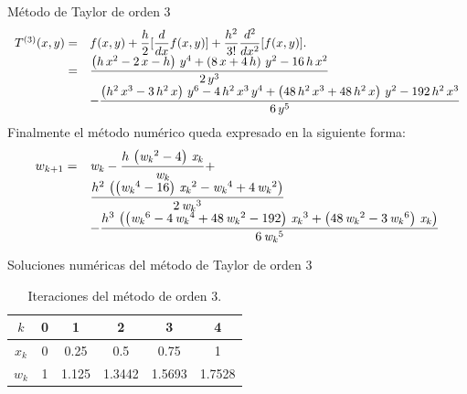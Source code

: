 \begin{frame}{Método de Taylor de orden 3}
\small
\textcolor{cyan}{
\begin{displaymath}
\begin{array}{rl}
T^{(3)}(x,y)=&f(x,y)+\dfrac{h}{2}[\dfrac{d}{dx}f(x,y)]+\dfrac{h^{2}}{3!}\dfrac{d^{2}}{dx^{2}}[f(x,y)].\\
=&\displaystyle {{\left(h\,x^2-2\,x-h\right)\,y^4+\left(8\,x+4\,h\right)\,y^2-16\,h
 \,x^2}\over{2\,y^3}}\\
 &\displaystyle -{{\left(h^2\,x^3-3\,h^2\,x\right)\,y^6-4\,h^2\,x^3\,y^4+\left(48\,
 h^2\,x^3+48\,h^2\,x\right)\,y^2-192\,h^2\,x^3}\over{6\,y^5}}
\end{array}
\end{displaymath}
}
Finalmente el método numérico queda expresado en la siguiente forma:
\textcolor{cyan}{
\begin{displaymath}
\renewcommand{\arraystretch}{1.5}
\begin{array}{rl}
w_{k+1}=&\displaystyle {\it w_k}-{{h\,\left({\it w_k}^2-4\right)\,{\it x_k}}\over{
 {\it w_k}}}+\\
 &\displaystyle {{h^2\,\left(\left({\it w_k}^4-16\right)\,{\it x_k}^2-{\it w_k}^
 4+4\,{\it w_k}^2\right)}\over{2\,{\it w_k}^3}}\\
 &\displaystyle -{{h^3\,\left(\left({\it w_k}^6-4\,{\it w_k}^4+48\,{\it w_k}^2-
 192\right)\,{\it x_k}^3+\left(48\,{\it w_k}^2-3\,{\it w_k}^6
 \right)\,{\it x_k}\right)}\over{6\,{\it w_k}^5}}
\end{array}
\end{displaymath}
}
\end{frame}
\begin{frame}{Soluciones numéricas del método de Taylor de orden 3}
\begin{table}[H]
\renewcommand{\arraystretch}{1.4}
\begin{tabular}{cccccc}
$k$&0&1&2&3&4\\\hline
$x_k$&0&0.25&0.5&0.75&1\\
$w_k$&1&1.125&1.3442&1.5693&1.7528\\\hline
\end{tabular}
\caption{Iteraciones del método de orden 3.}
\end{table}
\end{frame}
